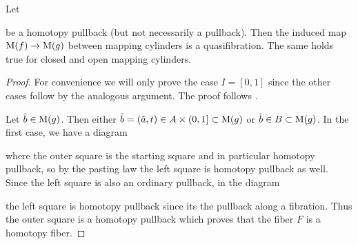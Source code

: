 \begin{lemma}\label{lem:mapOfCylIsQuasiFib} %
    Let 
    \begin{center}
    \end{center}
    be a homotopy pullback (but not necessarily a pullback).
    Then the induced map $\operatorname{M}(f)\to\operatorname{M}(g)$ between mapping cylinders is a quasifibration.
    The same holds true for closed and open mapping cylinders.
    \begin{proof}
        For convenience we will only prove the case $I=[0,1]$ since the other cases follow by the analogous argument.
        The proof follows \cite[Lemma 5.10.6]{cubical_htpy_theory}.

        Let $\hat{b}\in\operatorname{M}(g)$. 
        Then either $\hat{b}=(\hat{a},t)\in A\times(0,1]\subset\operatorname{M}(g)$ or $\hat{b}\in B\subset\operatorname{M}(g)$.
        In the first case, we have a diagram
        \begin{center}
        \end{center}
        where the outer square is the starting square and in particular homotopy pullback, so by the pasting law the left square is homotopy pullback as well.
        Since the left square is also an ordinary pullback, in the diagram
        \begin{center}
        \end{center}
        the left square is homotopy pullback since its the pullback along a fibration.
        Thus the outer square is a homotopy pullback which proves that the fiber $F$ is a homotopy fiber.


\end{proof}
\end{lemma}
